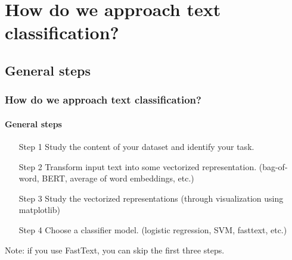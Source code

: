 \documentclass{beamer}
\begin{document}

\section{How do we approach text classification?}

\subsection{General steps}
\begin{frame}
    \frametitle{How do we approach text classification?}
    \framesubtitle{General steps}
    \begin{enumerate}
        \item[Step 1] Study the content of your dataset and identify your task. 
        \item[Step 2] Transform input text into some vectorized representation. (bag-of-word, BERT, average of word embeddings, etc.)
        \item[Step 3] Study the vectorized representations (through visualization using matplotlib)
        \item[Step 4] Choose a classifier model. (logistic regression, SVM, fasttext, etc.)
    \end{enumerate}
    Note: if you use FastText, you can skip the first three steps.
\end{frame}
\end{document}
